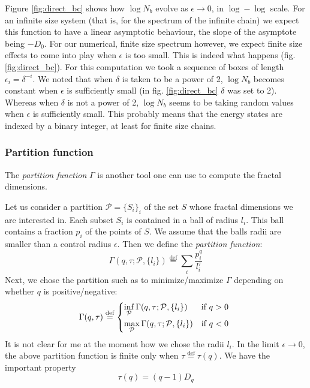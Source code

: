 \documentclass[11pt]{article}
\newcommand{\define}{\ensuremath{ \overset{\text{def}}{=} }}
\begin{document}
Figure \eqref{fig:direct_bc} shows how $\log N_b$ evolve as $\epsilon \rightarrow 0$, in $\log-\log$ scale. 
For an infinite size system (that is, for the spectrum of the infinite chain) we expect this function to have a linear asymptotic behaviour, the slope of the asymptote being $-D_0$.
For our numerical, finite size spectrum however, we expect finite size effects to come into play when $\epsilon$ is too small.
This is indeed what happens (fig. \eqref{fig:direct_bc}). For this computation we took a sequence of boxes of length $\epsilon_i = \delta^{-i}$. We noted that when $\delta$ is taken to be a power of 2, $\log N_b$ becomes constant when $\epsilon$ is sufficiently small (in fig. \eqref{fig:direct_bc} $\delta$ was set to 2). Whereas when $\delta$ is not a power of 2, $\log N_b$ seems to be taking random values when $\epsilon$ is sufficiently small. 
This probably means that the energy states are indexed by a binary integer, at least for finite size chains.

\subsubsection{Partition function}

The \emph{partition function} $\Gamma$ is another tool one can use to compute the fractal dimensions. 

Let us consider a partition $\mathcal{P}=\{ S_i \}_i$ of the set $S$ whose fractal dimensions we are interested in. Each subset $S_i$ is contained in a ball of radius $l_i$. This ball contains a fraction $p_i$ of the points of $S$. 
We assume that the balls radii are smaller than a control radius $\epsilon$.
Then we define the \emph{partition function}:
\begin{equation}
	\Gamma(q,\tau;\mathcal{P}, \{l_i\}) \define \sum_i \frac{p_i^q}{l_i^\tau}
\end{equation}
Next, we chose the partition such as to minimize/maximize $\Gamma$ depending on whether $q$ is positive/negative:
\begin{equation}
\Gamma(q,\tau) \define \begin{dcases*}
        \inf_{\mathcal{P}} \Gamma(q,\tau;\mathcal{P}, \{l_i\}) & if $q>0$ \\
        \max_{\mathcal{P}} \Gamma(q,\tau;\mathcal{P}, \{l_i\}) & if $q<0$
        \end{dcases*}
\end{equation}
It is not clear for me at the moment how we chose the radii $l_i$.
In the limit $\epsilon \rightarrow 0$, the above partition function is finite only when $\tau \define \tau(q)$. We have the important property
\begin{equation}
	\tau(q) = (q-1) D_q
\end{equation}
\end{document}
